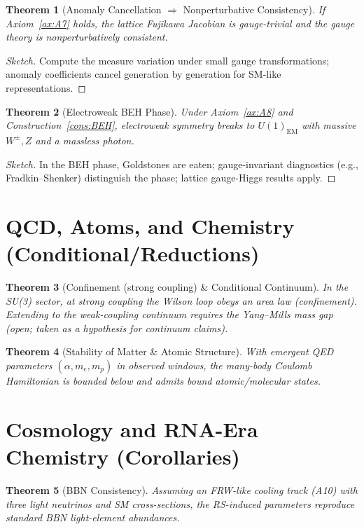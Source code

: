 \documentclass[11pt]{article}
\theoremstyle{plain}
\newtheorem{theorem}{Theorem}[section]
\theoremstyle{definition}
\theoremstyle{remark}
\begin{document}
\begin{theorem}[Anomaly Cancellation $\Rightarrow$ Nonperturbative Consistency]\label{thm:anomaly}
If Axiom~\ref{ax:A7} holds, the lattice Fujikawa Jacobian is gauge-trivial and the gauge theory is nonperturbatively consistent.
\end{theorem}
\begin{proof}[Sketch]
Compute the measure variation under small gauge transformations; anomaly coefficients cancel generation by generation for SM-like representations.
\end{proof}

\begin{theorem}[Electroweak BEH Phase]\label{thm:BEH}
Under Axiom~\ref{ax:A8} and Construction~\ref{cons:BEH}, electroweak symmetry breaks to $U(1)_{\mathrm{EM}}$ with massive $W^\pm, Z$ and a massless photon.
\end{theorem}
\begin{proof}[Sketch]
In the BEH phase, Goldstones are eaten; gauge-invariant diagnostics (e.g., Fradkin--Shenker) distinguish the phase; lattice gauge-Higgs results apply.
\end{proof}

\section{QCD, Atoms, and Chemistry (Conditional/Reductions)}

\begin{theorem}[Confinement (strong coupling) \& Conditional Continuum]\label{thm:conf}
In the SU(3) sector, at strong coupling the Wilson loop obeys an area law (confinement). Extending to the weak-coupling continuum requires the Yang--Mills mass gap (open; taken as a hypothesis for continuum claims).
\end{theorem}

\begin{theorem}[Stability of Matter \& Atomic Structure]\label{thm:stability}
With emergent QED parameters $(\alpha,m_e,m_p)$ in observed windows, the many-body Coulomb Hamiltonian is bounded below and admits bound atomic/molecular states.
\end{theorem}

\section{Cosmology and RNA-Era Chemistry (Corollaries)}

\begin{theorem}[BBN Consistency]\label{thm:bbn}
Assuming an FRW-like cooling track (A10) with three light neutrinos and SM cross-sections, the RS-induced parameters reproduce standard BBN light-element abundances.
\end{theorem}
\end{document}
